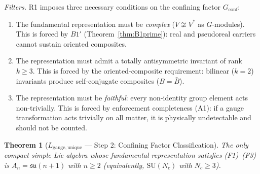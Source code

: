 \documentclass[11pt,a4paper]{article}
\newtheorem{theorem}{Theorem}[section]
\theoremstyle{definition}
\newcommand{\SU}{\mathrm{SU}}
\begin{document}
\noindent\textit{Filters.}  R1 imposes three necessary conditions on the
confining factor $G_{\mathrm{conf}}$:
\begin{enumerate}[label=(F\arabic*),nosep]
  \item The fundamental representation must be \emph{complex}
        ($V \not\cong V^*$ as $G$-modules).  This is forced by $B1'$
        (Theorem~\ref{thm:B1prime}): real and pseudoreal carriers
        cannot sustain oriented composites.
  \item The representation must admit a totally antisymmetric invariant
        of rank $k \ge 3$.  This is forced by the oriented-composite
        requirement: bilinear ($k=2$) invariants produce self-conjugate
        composites ($B = \bar{B}$).
  \item The representation must be \emph{faithful}: every non-identity
        group element acts non-trivially.  This is forced by enforcement
        completeness (A1): if a gauge transformation acts trivially on
        all matter, it is physically undetectable and should not be
        counted.
\end{enumerate}

\begin{theorem}[$L_{\mathrm{gauge,unique}}$ --- Step 2: Confining Factor Classification]\label{thm:R1_class}
The only compact simple Lie algebra whose fundamental representation
satisfies (F1)--(F3) is $A_n = \mathfrak{su}(n+1)$ with $n \ge 2$
(equivalently, $\SU(N_c)$ with $N_c \ge 3$).
\end{theorem}
\end{document}
